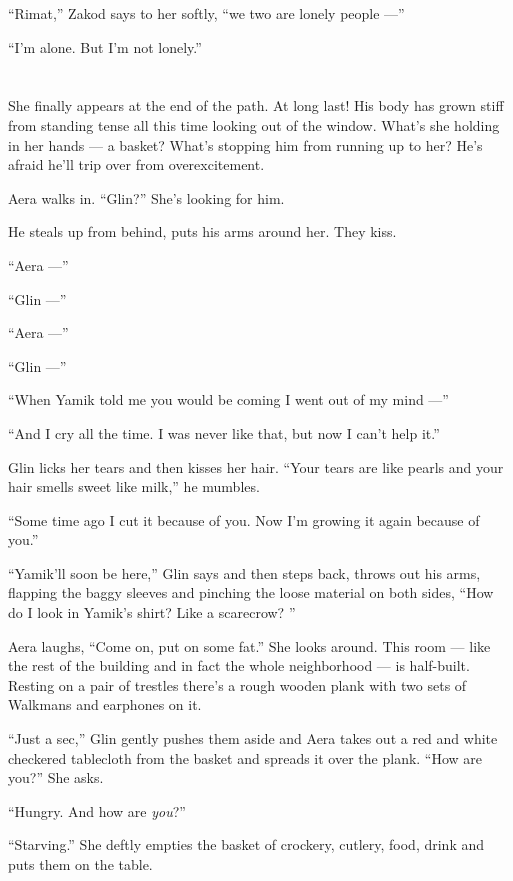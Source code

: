 \documentclass[twoside,11pt,openany]{book}
\begin{document}
``Rimat,'' Zakod says to her softly, ``we two are lonely people ---''

``I'm alone. But I'm not lonely.''


\chapter{}

She finally appears at the end of the path. At long last! His body has grown stiff from standing
tense{ }all this time looking out of the window. What's she holding in her
hands --- a basket? What's stopping him from running up to her?  He's afraid he'll trip over from overexcitement.

Aera walks in. ``Glin?'' She's looking for him.

He steals up from behind, puts his arms around her. They kiss.

``Aera ---''

``Glin ---''

``Aera ---''

``Glin ---''

``When Yamik told me you would be coming I went out of my mind ---''

``And I cry all the time. I was never like that, but now I can't help it.''

Glin licks her tears and then kisses her hair. ``Your tears are like pearls and your hair smells sweet
like milk,'' he mumbles.

``Some time ago I cut it because of you. Now I'm growing it again because of you.''

``Yamik'll soon be here,'' Glin says and then steps back, throws
out{ }his arms, flapping the baggy sleeves and pinching the loose material on
both sides, ``How do I look in Yamik's shirt? Like a scarecrow? ''

Aera laughs, ``Come on, put on some fat.'' She looks around. This room ---  like the rest of
the building and in fact the whole neighborhood --- is half-built. Resting on
a pair of trestles there's a rough wooden plank with two sets of Walkmans and earphones on it.

``Just a sec,'' Glin gently pushes them aside and Aera takes out a red and white checkered
tablecloth from the basket and spreads it over the plank. ``How are you?'' She asks.

``Hungry. And how are \textit{you}?''

``Starving.'' She deftly empties the basket of crockery, cutlery, food, drink and puts them on
the table.
\end{document}
